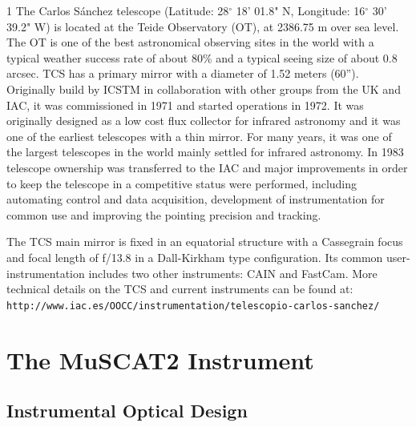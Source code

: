 \documentclass[a4paper,12pt]{spieman}  %
\begin{document}
\begin{spacing}{1}
The Carlos S\'anchez telescope
(Latitude: 28$^{\circ}$ 18' 01.8" N, Longitude: 16$^{\circ}$ 30' 39.2" W)
is located at the Teide Observatory (OT), at 2386.75 m over sea level.
The OT is one of the best astronomical observing sites in the world 
with a typical weather success rate of about 80\% and a typical seeing size of about 0.8 arcsec.
TCS has a primary mirror with a diameter of 1.52 meters (60'').
Originally build by ICSTM in collaboration with other groups from the UK and IAC,
it was commissioned in 1971 and started operations in 1972.
It was originally designed as a low cost flux collector for infrared astronomy
and it was one of the earliest telescopes with a thin mirror.
For many years, it was one of the largest telescopes in the world mainly settled
for infrared astronomy.
In 1983 telescope ownership was transferred to the IAC and major improvements
in order to keep the telescope in a competitive status were performed,
including automating control and data acquisition, development of instrumentation
for common use and improving the pointing precision and tracking. 

The TCS main mirror is fixed in an equatorial structure with a Cassegrain focus
and focal length of f/13.8 in a Dall-Kirkham type configuration.
Its common user-instrumentation includes two other instruments:
CAIN and FastCam.
More technical details on the TCS and current instruments can be found at:\\
\verb|http://www.iac.es/OOCC/instrumentation/telescopio-carlos-sanchez/|


\section{The MuSCAT2 Instrument}
\label{sect:MuSCAT2}  %


\subsection{Instrumental Optical Design}
\label{subsec:design}


\end{spacing}
\end{document}
